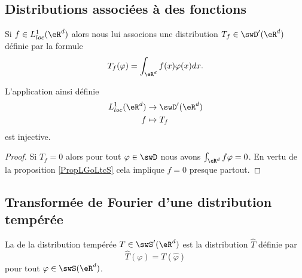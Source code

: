 \subsection{Distributions associées à des fonctions}

Si \( f\in L^1_{loc}(\eR^d)\) alors nous lui associons une distribution \( T_f\in \swD'(\eR^d)\) définie par la formule
\begin{equation}
    T_f(\varphi)=\int_{\eR^d}f(x)\varphi(x)dx.
\end{equation}

\begin{proposition}
    L'application ainsi définie
    \begin{equation}
        \begin{aligned}
            L^1_{loc}(\eR^d)&\to \swD'(\eR^d) \\
            f&\mapsto T_f 
        \end{aligned}
    \end{equation}
    est injective.
\end{proposition}

\begin{proof}
    Si \( T_f=0\) alors pour tout \( \varphi\in \swD\) nous avons \( \int_{\eR^d}f\varphi=0\). En vertu de la proposition \ref{PropLGoLtcS} cela implique \( f=0\) presque partout.
\end{proof}

\subsection{Transformée de Fourier d'une distribution tempérée}

\begin{definition}
    La  de la distribution tempérée \( T\in\swS'(\eR^d)\) est la distribution \( \hat T\) définie par
    \begin{equation}
        \hat T(\varphi)=T(\hat \varphi)
    \end{equation}
    pour tout \( \varphi\in\swS(\eR^d)\).
\end{definition}

